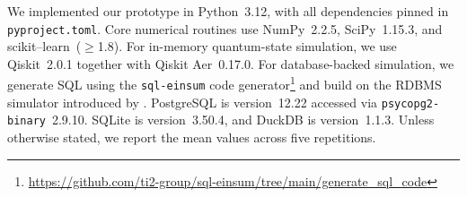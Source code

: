 We implemented our prototype in Python~3.12, with all dependencies pinned in
\texttt{pyproject.toml}. Core numerical routines use NumPy~2.2.5, SciPy~1.15.3, and
scikit--learn~(\(\ge\)1.8). For in-memory quantum-state simulation, we use
Qiskit~2.0.1 together with Qiskit Aer~0.17.0. For database-backed simulation, we
generate SQL using the \texttt{sql-einsum} code generator\footnote{\url{https://github.com/ti2-group/sql-einsum/tree/main/generate_sql_code}}
and build on the RDBMS simulator introduced by \cite{hai2025quantum}. 
PostgreSQL is version~12.22 
accessed via
\texttt{psycopg2-binary}~2.9.10. SQLite is version~3.50.4, and DuckDB is version~1.1.3. 
Unless otherwise stated, we report the mean values across
five repetitions.

 

 





